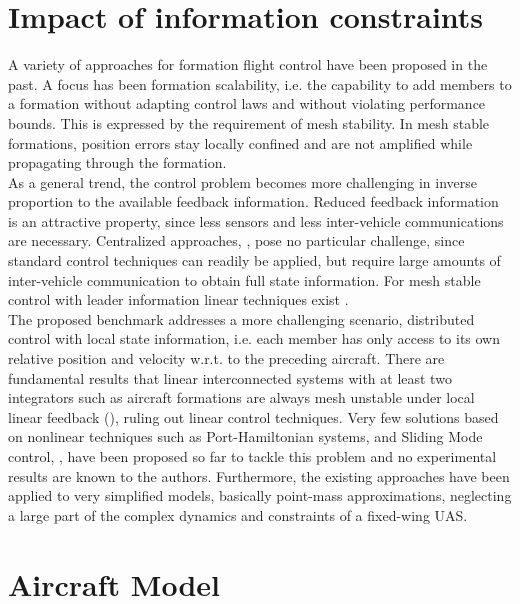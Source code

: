\documentclass{ifacconf}
\begin{document}
\section{Impact of information constraints}
\label{sec:infoconstr}
A variety of approaches for formation flight control have been proposed in the past. A focus has been formation scalability, i.e. the capability to add members to a formation without adapting control laws and without violating performance bounds. This is expressed by the requirement of mesh stability. In mesh stable formations, position errors stay locally confined and are not amplified while propagating through the formation.\\
As a general trend, the control problem becomes more challenging in inverse proportion to the available feedback information. Reduced feedback information is an attractive property, since less sensors and less inter-vehicle communications are necessary.
Centralized approaches, \cite{nageli2014environment}, pose no particular challenge, since standard control techniques can readily be applied, but require large amounts of inter-vehicle communication to obtain full state information. For mesh stable control with leader information linear techniques exist  \cite{shaw2007controller}.\\
The proposed benchmark addresses a more challenging scenario, distributed control with local state information, i.e. each member has only access to its own relative position and velocity w.r.t. to the preceding aircraft. 
There are fundamental results that linear interconnected systems with at least two integrators such as aircraft formations are always mesh unstable under local linear feedback (\cite{Pant2001}), ruling out linear control techniques.
Very few solutions based on nonlinear techniques such as Port-Hamiltonian systems, \cite{Knorn2014} and Sliding Mode control, \cite{galzi2006uav,Bolting2016}, have been proposed so far to tackle this problem and no experimental results are known to the authors. Furthermore, the existing approaches have been applied to very simplified models, basically point-mass approximations, neglecting a large part of the complex dynamics and constraints of a fixed-wing UAS. 
\section{Aircraft Model}
\label{sec:model}
\end{document}
